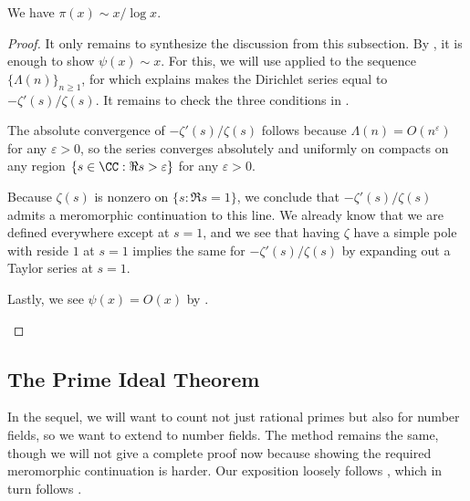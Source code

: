 \documentclass[../thesis.tex]{subfiles}
\begin{document}
\begin{theorem} \label{thm:prime}
	We have $\pi(x)\sim x/\log x$.
\end{theorem}
\begin{proof}
	It only remains to synthesize the discussion from this subsection. By , it is enough to show $\psi(x)\sim x$. For this, we will use  applied to the sequence $\{\Lambda(n)\}_{n\ge1}$, for which  explains makes the Dirichlet series equal to $-\zeta'(s)/\zeta(s)$. It remains to check the three conditions in .
	\begin{listroman}
		\item The absolute convergence of $-\zeta'(s)/\zeta(s)$ follows because $\Lambda(n)=O(n^\varepsilon)$ for any $\varepsilon>0$, so the series converges absolutely and uniformly on compacts on any region $\{s\in\CC:\Re s>\varepsilon\}$ for any $\varepsilon>0$.
		\item Because $\zeta(s)$ is nonzero on $\{s:\Re s=1\}$, we conclude that $-\zeta'(s)/\zeta(s)$ admits a meromorphic continuation to this line. We already know that we are defined everywhere except at $s=1$, and we see that having $\zeta$ have a simple pole with reside $1$ at $s=1$ implies the same for $-\zeta'(s)/\zeta(s)$ by expanding out a Taylor series at $s=1$.
		\item Lastly, we see $\psi(x)=O(x)$ by .
		\qedhere
	\end{listroman}
\end{proof}

\subsection{The Prime Ideal Theorem}
In the sequel, we will want to count not just rational primes but also for number fields, so we want to extend  to number fields. The method remains the same, though we will not give a complete proof now because showing the required meromorphic continuation is harder. Our exposition loosely follows \cite[Sections~7.4 and~7.7]{rv-fourier-analysis-number-fields}, which in turn follows \cite{heilbronn-zeta}.
\end{document}
